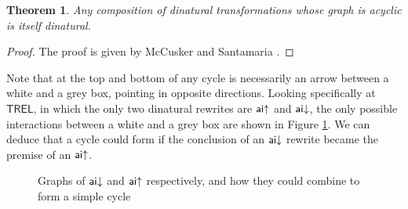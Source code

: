 \documentclass[11pt, oneside]{article}
\theoremstyle{plain}
\newtheorem{theorem}{Theorem}[section]
\theoremstyle{definition}
\newcommand{\sSys}{{\mathsf{TREL}}}%
\begin{document}
\begin{theorem}\label{thm:acyclic-dinatural}
Any composition of dinatural transformations whose graph is acyclic is itself dinatural.
\end{theorem}

\begin{proof}
The proof is given by McCusker and Santamaria \cite{mccusker2018compositionality}.
\end{proof}

Note that at the top and bottom of any cycle is necessarily an arrow between a white and a grey box, pointing in opposite directions. 
Looking specifically at $\sSys$, in which the only two dinatural rewrites are ${\mathsf {ai}}{ \uparrow}$ and ${\mathsf {ai}}{\downarrow}$, the only possible interactions between a white and a grey box are shown in Figure \ref{fig:cycles}.
We can deduce that a cycle could form if the conclusion of an ${\mathsf {ai}}{\downarrow}$ rewrite became the premise of an ${\mathsf {ai}}{ \uparrow}$.

\begin{figure}[ht]
    \begin{minipage}[h]{0.3\textwidth}
        \centering
    \end{minipage}
    \hfill
    \begin{minipage}[h]{0.3\textwidth}
        \centering
    \end{minipage}
    \hfill
    \begin{minipage}[h]{0.3\textwidth}
        \centering
    \end{minipage}

    \caption{Graphs of ${\mathsf {ai}}{\downarrow}$ and ${\mathsf {ai}}{ \uparrow}$ respectively, and how they could combine to form a simple cycle}
    \label{fig:cycles}
\end{figure}
\end{document}
